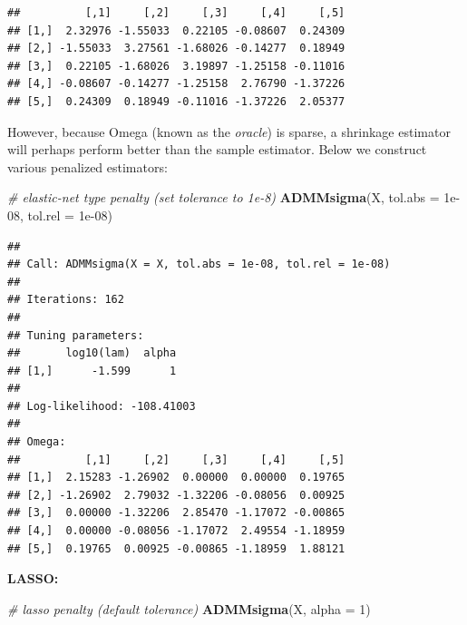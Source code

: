 \documentclass[12pt,]{book}
\newenvironment{Shaded}{\begin{snugshade}}{\end{snugshade}}
\newcommand{\CommentTok}[1]{\textcolor[rgb]{0.56,0.35,0.01}{\textit{#1}}}
\newcommand{\DataTypeTok}[1]{\textcolor[rgb]{0.13,0.29,0.53}{#1}}
\newcommand{\DecValTok}[1]{\textcolor[rgb]{0.00,0.00,0.81}{#1}}
\newcommand{\FloatTok}[1]{\textcolor[rgb]{0.00,0.00,0.81}{#1}}
\newcommand{\KeywordTok}[1]{\textcolor[rgb]{0.13,0.29,0.53}{\textbf{#1}}}
\newcommand{\NormalTok}[1]{#1}
\theoremstyle{definition}
\theoremstyle{definition}
\theoremstyle{definition}
\theoremstyle{remark}
\begin{document}
\begin{verbatim}
##          [,1]     [,2]     [,3]     [,4]     [,5]
## [1,]  2.32976 -1.55033  0.22105 -0.08607  0.24309
## [2,] -1.55033  3.27561 -1.68026 -0.14277  0.18949
## [3,]  0.22105 -1.68026  3.19897 -1.25158 -0.11016
## [4,] -0.08607 -0.14277 -1.25158  2.76790 -1.37226
## [5,]  0.24309  0.18949 -0.11016 -1.37226  2.05377
\end{verbatim}

\vspace{0.5cm}

However, because Omega (known as the \emph{oracle}) is sparse, a
shrinkage estimator will perhaps perform better than the sample
estimator. Below we construct various penalized estimators:

\vspace{0.5cm}

\begin{Shaded}
\begin{Highlighting}[]
\CommentTok{# elastic-net type penalty (set tolerance to 1e-8)}
\KeywordTok{ADMMsigma}\NormalTok{(X, }\DataTypeTok{tol.abs =} \FloatTok{1e-08}\NormalTok{, }\DataTypeTok{tol.rel =} \FloatTok{1e-08}\NormalTok{)}
\end{Highlighting}
\end{Shaded}

\begin{verbatim}
## 
## Call: ADMMsigma(X = X, tol.abs = 1e-08, tol.rel = 1e-08)
## 
## Iterations: 162
## 
## Tuning parameters:
##       log10(lam)  alpha
## [1,]      -1.599      1
## 
## Log-likelihood: -108.41003
## 
## Omega:
##          [,1]     [,2]     [,3]     [,4]     [,5]
## [1,]  2.15283 -1.26902  0.00000  0.00000  0.19765
## [2,] -1.26902  2.79032 -1.32206 -0.08056  0.00925
## [3,]  0.00000 -1.32206  2.85470 -1.17072 -0.00865
## [4,]  0.00000 -0.08056 -1.17072  2.49554 -1.18959
## [5,]  0.19765  0.00925 -0.00865 -1.18959  1.88121
\end{verbatim}

\vspace{0.5cm}

\textbf{LASSO:}

\vspace{0.5cm}

\begin{Shaded}
\begin{Highlighting}[]
\CommentTok{# lasso penalty (default tolerance)}
\KeywordTok{ADMMsigma}\NormalTok{(X, }\DataTypeTok{alpha =} \DecValTok{1}\NormalTok{)}
\end{Highlighting}
\end{Shaded}
\end{document}
